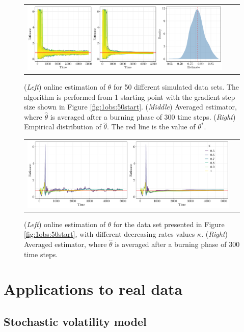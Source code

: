 \documentclass[12pt]{article}
\newcommand{\parvec}{\theta}
\begin{document}
\begin{figure}
\centering
\begin{tabular}{ccc}
\includegraphics[width = \textwidth]{Figure5.pdf}
\end{tabular}
\caption{\label{fig:50obs:1start}(\textit{Left}) online estimation of $\parvec$ for 50 different simulated data sets. The algorithm is performed from 1 starting point with the gradient step size shown in Figure \ref{fig:1obs:50start}. (\textit{Middle}) Averaged estimator, where $\hat{\parvec}$ is averaged after a burning phase of 300 time steps. (\textit{Right}) Empirical distribution of $\hat{\parvec}$. The red line is the value of $\parvec^*$.}
\end{figure}

\begin{figure}
\centering
\begin{tabular}{cc}
\includegraphics[height = .333\textwidth]{Figure6.pdf}
\end{tabular}
\caption{\label{fig:1obs:1start:6Grads}(\textit{Left}) online estimation of $\theta$ for the data set presented in Figure \ref{fig:1obs:50start}, with different decreasing rates values $\kappa$. (\textit{Right}) Averaged estimator, where $\hat{\parvec}$ is averaged after a burning phase of 300 time steps.}
\end{figure}

\section{Applications to real data}
\label{sec:real:data}

\subsection{Stochastic volatility model}
\label{sec:simu:sv}
\end{document}
